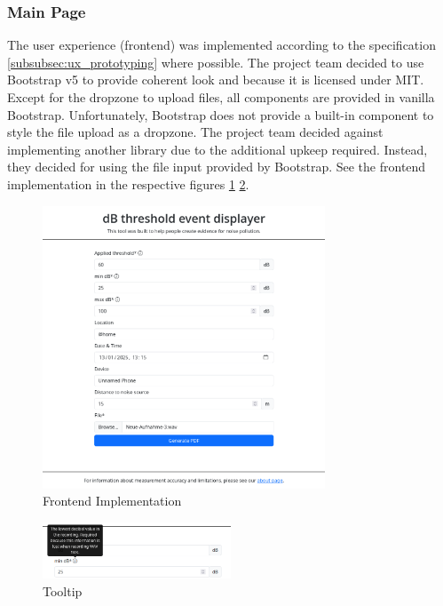\subsubsection{Main Page}\label{subsubsec:main-page}
The user experience (frontend) was implemented according to the specification \ref{subsubsec:ux_prototyping} where possible.
The project team decided to use Bootstrap v5 to provide coherent look and because it is licensed under MIT. Except for the dropzone to upload files,
all components are provided in vanilla Bootstrap. Unfortunately, Bootstrap does not provide a built-in component to style the file upload as a dropzone.
The project team decided against implementing another library due to the additional upkeep required. Instead, they decided for using the file input provided by Bootstrap.
See the frontend implementation in the respective figures \ref{fig:implementation-frontend} \ref{fig:implementation-tooltip}.
\begin{figure}[H]
    \centering
    \includegraphics[width=0.75\textwidth]{../assets/implementation_form.png}
    \caption{Frontend Implementation}\label{fig:implementation-frontend}
\end{figure}
\begin{figure}[H]
    \centering
    \includegraphics[width=0.5\textwidth]{../assets/implementation_tooltip.png}
    \caption{Tooltip}\label{fig:implementation-tooltip}
\end{figure}

